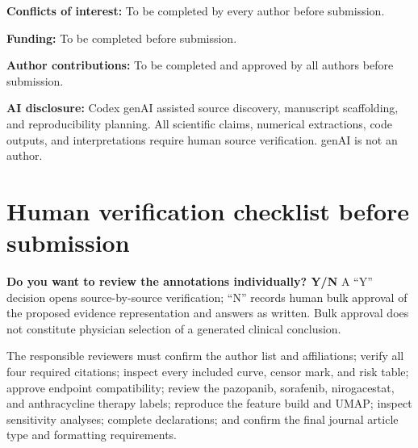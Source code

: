 \documentclass[17pt]{extarticle}
\begin{document}
\textbf{Conflicts of interest:} To be completed by every author before submission.

\textbf{Funding:} To be completed before submission.

\textbf{Author contributions:} To be completed and approved by all authors before submission.

\textbf{AI disclosure:} Codex genAI assisted source discovery, manuscript scaffolding, and reproducibility planning. All scientific claims, numerical extractions, code outputs, and interpretations require human source verification. genAI is not an author.

\section*{Human verification checklist before submission}

\textbf{Do you want to review the annotations individually? Y/N} A ``Y'' decision opens source-by-source verification; ``N'' records human bulk approval of the proposed evidence representation and answers as written. Bulk approval does not constitute physician selection of a generated clinical conclusion.

The responsible reviewers must confirm the author list and affiliations; verify all four required citations; inspect every included curve, censor mark, and risk table; approve endpoint compatibility; review the pazopanib, sorafenib, nirogacestat, and anthracycline therapy labels; reproduce the feature build and UMAP; inspect sensitivity analyses; complete declarations; and confirm the final journal article type and formatting requirements.



\end{document}
